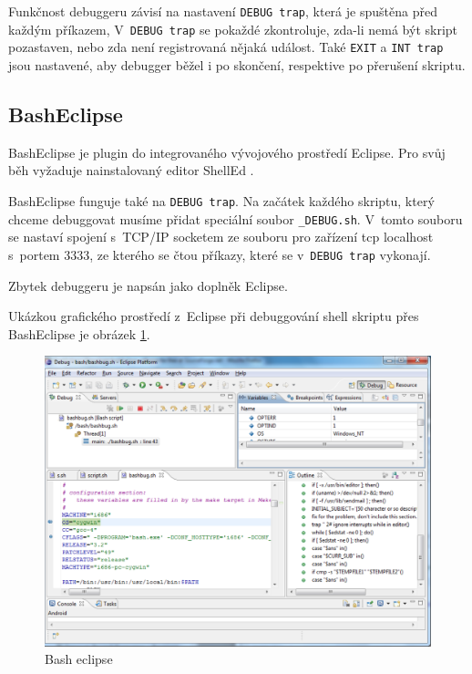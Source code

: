 \documentclass[thesis=M,czech]{FITthesis}[2012/06/26]
\begin{document}
Funkčnost debuggeru závisí na nastavení \texttt{DEBUG trap}, která je spuštěna před každým příkazem, V~\texttt{DEBUG trap} se pokaždé zkontroluje, zda-li nemá být skript pozastaven, nebo zda není registrovaná nějaká událost. Také \texttt{EXIT} a \texttt{INT trap} jsou nastavené, aby debugger běžel i po skončení, respektive po přerušení skriptu.





\subsection{BashEclipse}

BashEclipse \cite{basheclipse} je plugin do integrovaného vývojového prostředí Eclipse. Pro svůj běh vyžaduje nainstalovaný editor ShellEd \cite{shelled}.

BashEclipse funguje také na \texttt{DEBUG trap}. Na začátek každého skriptu, který chceme debuggovat musíme přidat speciální soubor \texttt{\_DEBUG.sh}. V~tomto souboru se nastaví spojení s~TCP/IP socketem ze souboru pro zařízení tcp localhost s~portem 3333, ze kterého se čtou příkazy, které se v~\texttt{DEBUG trap} vykonají.

Zbytek debuggeru je napsán jako doplněk Eclipse.

Ukázkou grafického prostředí z~Eclipse při debuggování shell skriptu přes BashEclipse je obrázek \ref{fig:bash_eclipse}.

\begin{figure}
	\includegraphics[width=1.0\textwidth]{./images/bash_eclipse}
	\caption{Bash eclipse}
	\label{fig:bash_eclipse}
\end{figure}
\end{document}
